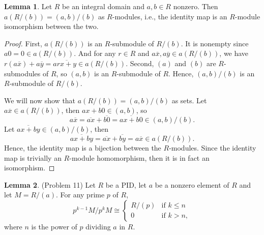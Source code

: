 \documentclass[12pt]{article}
\theoremstyle{definition}
\newtheorem{lemma}{Lemma}
\newcommand{\isom}{\cong}
\newcommand{\eqc}{\overline}
\begin{document}
\thispagestyle{title}




\begin{lemma}
    Let $R$ be an integral domain and $a, b \in R$ nonzero. Then $a(R/(b)) = (a, b)/(b)$ as $R$-modules, i.e., the identity map is an $R$-module isomorphism between the two. 
\end{lemma}

\begin{proof}
    First, $a(R/(b))$ is an $R$-submodule of $R/(b)$. It is nonempty since $a0 = 0 \in a(R/(b))$. And for any $r \in R$ and $a\eqc{x}, a\eqc{y} \in a(R/(b))$, we have $r(a\eqc{x}) + a\eqc{y} = a\eqc{rx + y} \in a(R/(b))$. Second, $(a)$ and $(b)$ are $R$-submodules of $R$, so $(a, b)$ is an $R$-submodule of $R$. Hence, $(a, b)/(b)$ is an $R$-submodule of $R/(b)$.
    
    We will now show that $a(R/(b)) = (a, b)/(b)$ as sets. Let $a\eqc{x} \in a(R/(b))$, then $ax + b0 \in (a, b)$, so
    \[
        a\eqc{x} = \eqc{ax} + \eqc{b0} = \eqc{ax + b0} \in (a, b)/(b).
    \]
    Let $\eqc{ax + by} \in (a, b)/(b)$, then
    \[
        \eqc{ax + by} = \eqc{ax} + \eqc{by} = a\eqc{x} \in a(R/(b)).
    \]
    Hence, the identity map is a bijection between the $R$-modules. Since the identity map is trivially an $R$-module homomorphism, then it is in fact an isomorphism.
    
\end{proof}

\begin{lemma}(Problem 11)
    Let $R$ be a PID, let $a$ be a nonzero element of $R$ and let $M = R/(a)$. For any prime $p$ of $R$,
    \[
        p^{k-1}M/p^kM \isom \begin{cases}
            R/(p) &\text{if } k \leq n \\
            0 &\text{if } k > n,
        \end{cases}
    \]
    where $n$ is the power of $p$ dividing $a$ in $R$.
\end{lemma}
\end{document}
